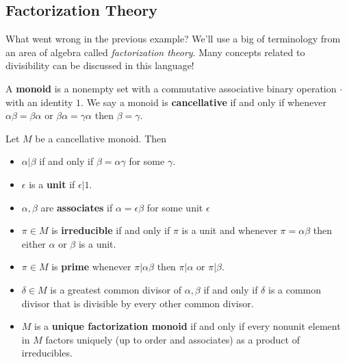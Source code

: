 \hypertarget{factorization-theory}{%
\subsection{Factorization Theory}\label{factorization-theory}}

\begin{remark}

What went wrong in the previous example? We'll use a big of terminology
from an area of algebra called \emph{factorization theory}. Many
concepts related to divisibility can be discussed in this language!

\end{remark}

\begin{definition}[Monoid]

A \textbf{monoid} is a nonempty set with a commutative associative
binary operation \(\cdot\) with an identity \(1\). We say a monoid is
\textbf{cancellative} if and only if whenever
\(\alpha \beta= \beta \alpha\) or \(\beta \alpha = \gamma \alpha\) then
\(\beta = \gamma\).

\end{definition}

\begin{definition}

Let \(M\) be a cancellative monoid. Then

\begin{itemize}
\item
  \(\alpha\mathrel{\Big|}\beta\) if and only if \(\beta= \alpha \gamma\)
  for some \(\gamma\).
\item
  \(\epsilon\) is a \textbf{unit} if \(\epsilon\mathrel{\Big|}1\).
\item
  \(\alpha , \beta\) are \textbf{associates} if
  \(\alpha = \epsilon \beta\) for some unit \(\epsilon\)
\item
  \(\pi\in M\) is \textbf{irreducible} if and only if \(\pi\) is a unit
  and whenever \(\pi= \alpha \beta\) then either \(\alpha\) or \(\beta\)
  is a unit.
\item
  \(\pi \in M\) is \textbf{prime} whenever
  \(\pi\mathrel{\Big|}\alpha \beta\) then \(\pi\mathrel{\Big|}\alpha\)
  or \(\pi\mathrel{\Big|}\beta\).
\item
  \(\delta \in M\) is a greatest common divisor of \(\alpha, \beta\) if
  and only if \(\delta\) is a common divisor that is divisible by every
  other common divisor.
\item
  \(M\) is a \textbf{unique factorization monoid} if and only if every
  nonunit element in \(M\) factors uniquely (up to order and associates)
  as a product of irreducibles.
\end{itemize}

\end{definition}

